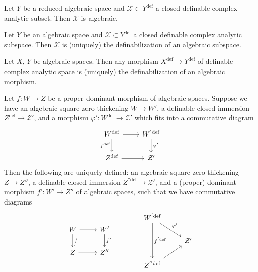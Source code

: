 \documentclass[
	fontsize=10pt, %
]{kaohandt}
\newcommand{\definable}{\mathrm{def}}
\begin{document}
\begin{theorem}
    Let $Y$ be a reduced algebraic space and 
    $\mathcal{X} \subset Y^{\definable}$ a closed definable complex analytic subset.
    Then $\mathcal{X}$ is algebraic.
\end{theorem}

\begin{corollary}
    Let $Y$ be an algebraic space and $\mathcal{X} \subset Y^{\definable}$ a closed definable complex analytic subspace.
    Then $\mathcal{X}$ is (uniquely) the definabilization of an algebraic subspace.
\end{corollary}

\begin{corollary}
    Let $X$, $Y$ be algebraic spaces.
    Then any morphism $X^{\definable} \to Y^{\definable}$ of definable complex analytic space is (uniquely) the definabilization of an algebraic morphism.
\end{corollary}

\begin{proposition}
    Let $f: W \to Z$ be a proper dominant morphism of algebraic spaces.
    Suppose we have an algebraic square-zero thickening
    $W \to W'$, a definable closed immersion $Z^{\definable} \to \mathcal{Z}'$,
    and a morphism $\varphi': W^{\definable}\to \mathcal{Z}'$ which fits into a commutative diagram
    \[\begin{tikzcd}
        W^{\definable} \ar[r]\ar[d,"f^{\definable}"'] & W^{'\definable}\ar[d,"\varphi'"] \\
        Z^{\definable} \ar[r] & \mathcal{Z}'
    \end{tikzcd}\]
    Then the following are uniquely defined:
    an algebraic square-zero thickening
    $Z \to Z''$,
    a definable closed immersion $Z^{''\definable} \to \mathcal{Z}'$,
    and a (proper) dominant morphism $f': W' \to Z''$ of algebraic spaces,
    such that we have commutative diagrams
    \[
    \begin{tikzcd}
        W\ar[r]\ar[d,"f"] & W'\ar[d,"f'"] \\
        Z \ar[r] & Z''
    \end{tikzcd}
    \hspace{40pt}
    \begin{tikzcd}
        W^{'\definable}\ar[dd,"f^{'\definable}"]\ar[rd,"\varphi'"] & \\
        & \mathcal{Z}' \\
        Z^{''\definable}\ar[ur] &
    \end{tikzcd}
    \]
\end{proposition}
\end{document}
